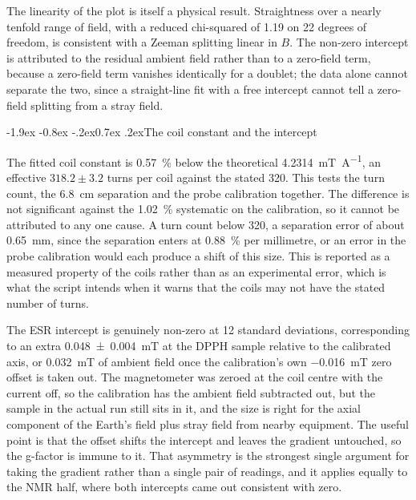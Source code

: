 \documentclass[11pt,a4paper]{article}
\makeatletter
\renewcommand\subsection{\@startsection{subsection}{2}{\z@}%
  {-1.9ex \@plus -0.8ex \@minus -.2ex}{0.7ex \@plus .2ex}{\normalfont\normalsize\bfseries}}
\makeatother
\begin{document}
The linearity of the plot is itself a physical result. Straightness over a nearly tenfold range of
field, with a reduced chi-squared of 1.19 on 22 degrees of freedom, is consistent with a Zeeman
splitting linear in $B$. The non-zero intercept is attributed to the residual ambient field rather
than to a zero-field term, because a zero-field term vanishes identically for a doublet; the data
alone cannot separate the two, since a straight-line fit with a free intercept cannot tell a
zero-field splitting from a stray field.

\subsection{The coil constant and the intercept}

The fitted coil constant is \SI{0.57}{\percent} below the theoretical
\SI{4.2314}{\milli\tesla\per\ampere}, an effective $318.2 \pm 3.2$ turns per coil against the
stated 320. This tests the turn count, the \SI{6.8}{\centi\metre} separation and the probe
calibration together. The difference is not significant against the \SI{1.02}{\percent} systematic
on the calibration, so it cannot be attributed to any one cause. A turn count below 320, a
separation error of about \SI{0.65}{\milli\metre}, since the separation enters at
\SI{0.88}{\percent} per millimetre, or an error in the probe calibration would each produce a
shift of this size. This is reported as a
measured property of the coils rather than as an experimental error, which is what the script
intends when it warns that the coils may not have the stated number of turns.

The ESR intercept is genuinely non-zero at 12 standard deviations, corresponding to an extra
\SI{+0.048 \pm 0.004}{\milli\tesla} at the DPPH sample relative to the calibrated axis, or
\SI{+0.032}{\milli\tesla} of ambient field once the calibration's own \SI{-0.016}{\milli\tesla}
zero offset is taken out. The magnetometer was zeroed at the coil
centre with the current off, so the calibration has the ambient field subtracted out, but the
sample in the actual run still sits in it, and the size is right for the axial component of the
Earth's field plus stray field from nearby equipment. The useful point
is that the offset shifts the intercept and leaves the gradient untouched, so the g-factor is
immune to it. That asymmetry is the strongest single argument for taking the gradient rather than a
single pair of readings, and it applies equally to the NMR half, where both intercepts came out
consistent with zero.
\end{document}
